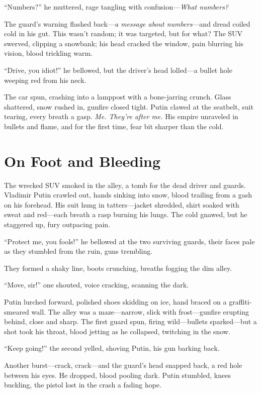 \documentclass[12pt]{book}
\begin{document}
\enquote{Numbers?} he muttered, rage tangling with confusion---\textit{What numbers?}

The guard’s warning flashed back---\textit{a message about numbers}---and dread coiled cold in his gut. This wasn’t random; it was targeted, but for what? The SUV swerved, clipping a snowbank; his head cracked the window, pain blurring his vision, blood trickling warm.

\enquote{Drive, you idiot!} he bellowed, but the driver’s head lolled---a bullet hole weeping red from his neck.

The car spun, crashing into a lamppost with a bone-jarring crunch. Glass shattered, snow rushed in, gunfire closed tight. Putin clawed at the seatbelt, suit tearing, every breath a gasp. \textit{Me. They’re after me.} His empire unraveled in bullets and flame, and for the first time, fear bit sharper than the cold.


\section{On Foot and Bleeding}

The wrecked SUV smoked in the alley, a tomb for the dead driver and guards. Vladimir Putin crawled out, hands sinking into snow, blood trailing from a gash on his forehead. His suit hung in tatters---jacket shredded, shirt soaked with sweat and red---each breath a rasp burning his lungs. The cold gnawed, but he staggered up, fury outpacing pain.

\enquote{Protect me, you fools!} he bellowed at the two surviving guards, their faces pale as they stumbled from the ruin, guns trembling.

They formed a shaky line, boots crunching, breaths fogging the dim alley.

\enquote{Move, sir!} one shouted, voice cracking, scanning the dark.

Putin lurched forward, polished shoes skidding on ice, hand braced on a graffiti-smeared wall. The alley was a maze---narrow, slick with frost---gunfire erupting behind, close and sharp. The first guard spun, firing wild---bullets sparked---but a shot took his throat, blood jetting as he collapsed, twitching in the snow.

\enquote{Keep going!} the second yelled, shoving Putin, his gun barking back.

Another burst---crack, crack---and the guard’s head snapped back, a red hole between his eyes. He dropped, blood pooling dark. Putin stumbled, knees buckling, the pistol lost in the crash a fading hope.
\end{document}
